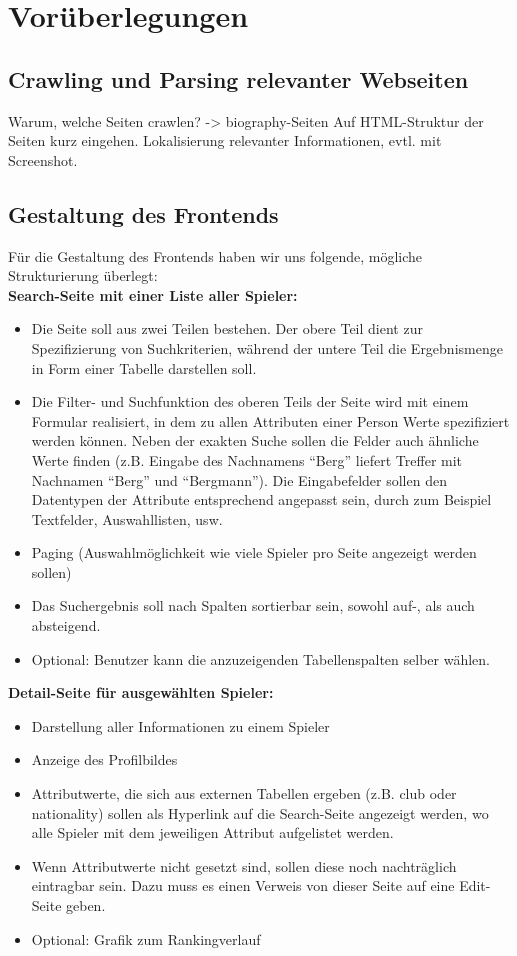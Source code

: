 \chapter{Vorüberlegungen}
\section{Crawling und Parsing relevanter Webseiten}
Warum, welche Seiten crawlen? -> biography-Seiten
Auf HTML-Struktur der Seiten kurz eingehen.
Lokalisierung relevanter Informationen, evtl. mit Screenshot.

\section{Gestaltung des Frontends}
Für die Gestaltung des Frontends haben wir uns folgende, mögliche Strukturierung überlegt:\\

\noindent\textbf{Search-Seite mit einer Liste aller Spieler:}
\begin{itemize}
\item Die Seite soll aus zwei Teilen bestehen. Der obere Teil dient zur Spezifizierung von Suchkriterien, während der untere Teil die Ergebnismenge in Form einer Tabelle darstellen soll.
\item Die Filter- und Suchfunktion des oberen Teils der Seite wird mit einem Formular realisiert, in dem zu allen Attributen einer Person Werte spezifiziert werden können. Neben der exakten Suche sollen die Felder auch ähnliche Werte finden (z.B. Eingabe des Nachnamens "`Berg"' liefert Treffer mit Nachnamen "`Berg"' und "`Bergmann"'). Die Eingabefelder sollen den Datentypen der Attribute entsprechend angepasst sein, durch zum Beispiel Textfelder, Auswahllisten, usw.
\item Paging (Auswahlmöglichkeit wie viele Spieler pro Seite angezeigt werden sollen)
\item Das Suchergebnis soll nach Spalten sortierbar sein, sowohl auf-, als auch absteigend.
\item Optional: Benutzer kann die anzuzeigenden Tabellenspalten selber wählen.
\end{itemize}

\noindent\textbf{Detail-Seite für ausgewählten Spieler:}
\begin{itemize}
\item Darstellung aller Informationen zu einem Spieler
\item Anzeige des Profilbildes
\item Attributwerte, die sich aus externen Tabellen ergeben (z.B. club oder nationality) sollen als Hyperlink auf die Search-Seite angezeigt werden, wo alle Spieler mit dem jeweiligen Attribut aufgelistet werden.
\item Wenn Attributwerte nicht gesetzt sind, sollen diese noch nachträglich eintragbar sein. Dazu muss es einen Verweis von dieser Seite auf eine Edit-Seite geben.
\item Optional: Grafik zum Rankingverlauf
\end{itemize}

